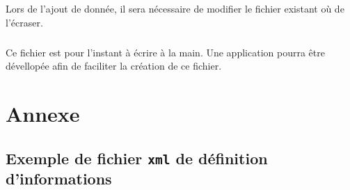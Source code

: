 \documentclass{report}
\begin{document}
Lors de l'ajout de donnée, il sera nécessaire de modifier le fichier existant où de l'écraser.

\paragraph{}
Ce fichier est pour l'instant à écrire à la main. Une application pourra être dévellopée afin de faciliter la création de ce fichier.


\chapter{Annexe}

\section*{Exemple de fichier \texttt{xml} de définition d'informations}
\end{document}
